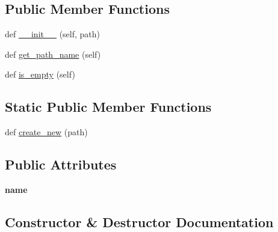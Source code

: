 \subsection*{Public Member Functions}
\begin{DoxyCompactItemize}
\item 
def \hyperlink{classhal_1_1files_1_1models_1_1_directory_ae4f13948eb8127b0c62f56d0ddf154b1}{\+\_\+\+\_\+init\+\_\+\+\_\+} (self, path)
\item 
def \hyperlink{classhal_1_1files_1_1models_1_1_directory_a58118af8552193237b38f7f341773707}{get\+\_\+path\+\_\+name} (self)
\item 
def \hyperlink{classhal_1_1files_1_1models_1_1_directory_a2a7a4af7d8d8d9e8e0d121ae9b673ce7}{is\+\_\+empty} (self)
\end{DoxyCompactItemize}
\subsection*{Static Public Member Functions}
\begin{DoxyCompactItemize}
\item 
def \hyperlink{classhal_1_1files_1_1models_1_1_directory_ac1f283483a8ae3cdc09634882be2e419}{create\+\_\+new} (path)
\end{DoxyCompactItemize}
\subsection*{Public Attributes}
\begin{DoxyCompactItemize}
\item 
{\bfseries name}\hypertarget{classhal_1_1files_1_1models_1_1_directory_a881eb92f96a89ccd626fb1c4be7da135}{}\label{classhal_1_1files_1_1models_1_1_directory_a881eb92f96a89ccd626fb1c4be7da135}

\end{DoxyCompactItemize}


\subsection{Constructor \& Destructor Documentation}
